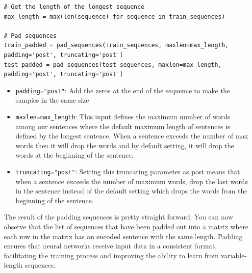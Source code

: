 \begin{lstlisting}
# Get the length of the longest sequence
max_length = max(len(sequence) for sequence in train_sequences)
	
# Pad sequences
train_padded = pad_sequences(train_sequences, maxlen=max_length, padding='post', truncating='post')
test_padded = pad_sequences(test_sequences, maxlen=max_length, padding='post', truncating='post')
\end{lstlisting}

\begin{itemize}
	\item \verb*|padding="post"|: Add the zeros at the end of the sequence to make the samples in the same size
	
	\item \verb*|maxlen=max_length|: This input defines the maximum number of words among our sentences where the default maximum length of sentences is defined by the longest sentence. When a sentence exceeds the number of max words then it will drop the words and by default setting, it will drop the words at the beginning of the sentence.
	
	\item \verb*|truncating="post"|: Setting this truncating parameter as post means that when a sentence exceeds the number of maximum words, drop the last words in the sentence instead of the default setting which drops the words from the beginning of the sentence.
\end{itemize}

The result of the padding sequences is pretty straight forward. You can now observe that the list of sequences that have been padded out into a matrix where each row in the matrix has an encoded sentence with the same length. Padding ensures that neural networks receive input data in a consistent format, facilitating the training process and improving the ability to learn from variable-length sequences.







